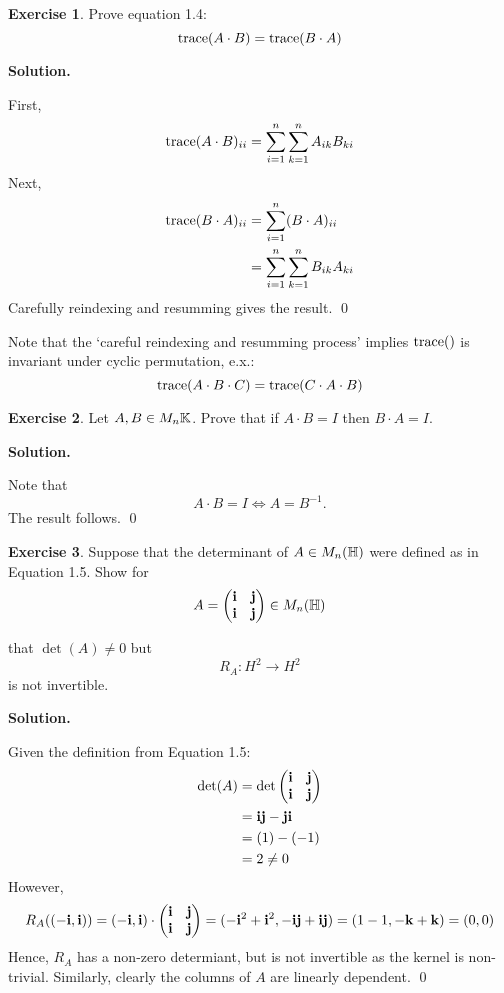 \documentclass[12pt]{book}
\theoremstyle{definition}
\newtheorem{exercise}{Exercise}[chapter]
\newenvironment{solution}
{%
  \par\noindent\textbf{Solution.}\quad
}
{%
  \qed\par
}
\begin{document}
\begin{exercise}
  Prove equation 1.4:
\[
\text{trace}({A \cdot B}) = \text{trace}({B \cdot A})
\]
\end{exercise}

\begin{solution}
  First,
  \[
    \begin{aligned}
      \text{trace}({A \cdot B})_{ii} &= \sum_{i=1}^n \sum_{k=1}^n A_{ik}B_{ki} \\
   \end{aligned}
  \]
  Next,
  \[
    \begin{aligned}
      \text{trace}({B \cdot A})_{ii} &= \sum_{i=1}^{n} (B \cdot A)_{ii} \\
                          &= \sum_{i=1}^n \sum_{k=1}^n B_{ik}A_{ki} \\
   \end{aligned}
  \]
  Carefully reindexing and resumming gives the result.
\end{solution}
Note that the `careful reindexing and resumming process' implies $\text{trace}({})$ is invariant under cyclic permutation, e.x.:
\[
  \text{trace}({A \cdot B \cdot C}) = \text{trace}({C \cdot A \cdot B})
\]

\begin{exercise}
  Let $A, B \in M_n{\mathbb{K}}$. Prove that if $A \cdot B = I$ then $B \cdot A = I$.
\end{exercise}

\begin{solution}
  Note that
  \[
  A \cdot B = I \iff A = B^{-1}.
  \]
  The result follows.
\end{solution}

\begin{exercise}
  Suppose that the determinant of $A \in M_n(\mathbb{H})$ were defined as in Equation 1.5. Show for 
\[
  A = \begin{pmatrix} \mathbf{i} & \mathbf{j} \\ \mathbf{i} & \mathbf{j} \end{pmatrix} \in M_n(\mathbb{H})
\]

that $\det(A) \neq 0$ but 
\[
R_A: H^2 \to H^2
\]
is not invertible.
\end{exercise}

\begin{solution}
  Given the definition from Equation 1.5:
  \[
    \begin{aligned}
      \det (A) &= \det \begin{pmatrix} \mathbf{i} & \mathbf{j} \\ \mathbf{i} & \mathbf{j} \end{pmatrix} \\
               &= \mathbf{i} \mathbf{j} - \mathbf{j} \mathbf{i} \\
               &= (1) - (-1) \\
               &= 2 \neq 0 \\
   \end{aligned}
  \]
  However,
  \[
  R_A((-\mathbf{i}, \mathbf{i})) = (-\mathbf{i}, \mathbf{i}) \cdot \begin{pmatrix} \mathbf{i} & \mathbf{j} \\ \mathbf{i} & \mathbf{j} \end{pmatrix} = (-\mathbf{i}^2 + \mathbf{i}^2, -\mathbf{i}\mathbf{j} + \mathbf{i}\mathbf{j}) = (1 - 1, -\mathbf{k} + \mathbf{k}) = (0, 0)
  \]
  Hence, $R_A$ has a non-zero determiant, but is not invertible as the kernel is non-trivial.
  Similarly, clearly the columns of $A$ are linearly dependent.
\end{solution}
\end{document}
